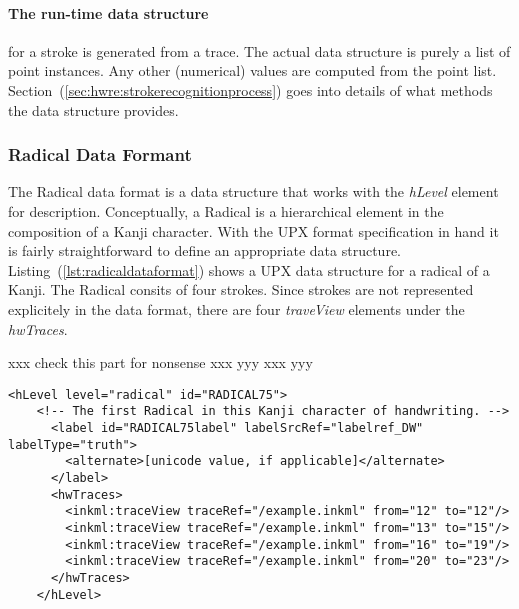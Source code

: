 \paragraph{The run-time data structure} for a stroke is generated from a trace.
The actual data structure is purely a list of point instances. 
Any other (numerical) values are computed from the point list. 
Section~(\ref{sec:hwre:strokerecognitionprocess}) goes into details of what 
methods the data structure provides.

\subsubsection{Radical Data Formant}
\label{sec:hwre:radicaldataformat}

The Radical data format is a data structure that works with the \emph{hLevel}
element for description.
Conceptually, a Radical is a hierarchical element in the composition of a Kanji
character. With the UPX format specification in hand it is fairly 
straightforward to define an appropriate data structure.
Listing~(\ref{lst:radicaldataformat}) shows a UPX data structure for a radical
of a Kanji. The Radical  consits of four strokes.
Since strokes are not represented explicitely in the data format,
there are four \emph{traveView} elements under the \emph{hwTraces}.

xxx check this part for nonsense xxx yyy xxx yyy
\begin{xmlcode}
  \begin{lstlisting}[emph={hLevel,hwTraces,label,alternative},
                     emphstyle=\color{blue}\textbf,
                     emph={[2]level,labelSrcRef,labelType,traceRef,from,to},
                     emphstyle={[2]\color{red}},
                     caption={A sample of how a stroke could be represented},
                     label=lst:radicaldataformat]
    <hLevel level="radical" id="RADICAL75">
    <!-- The first Radical in this Kanji character of handwriting. -->
      <label id="RADICAL75label" labelSrcRef="labelref_DW" labelType="truth">
        <alternate>[unicode value, if applicable]</alternate>
      </label>
      <hwTraces>
        <inkml:traceView traceRef="/example.inkml" from="12" to="12"/>
        <inkml:traceView traceRef="/example.inkml" from="13" to="15"/>
        <inkml:traceView traceRef="/example.inkml" from="16" to="19"/>
        <inkml:traceView traceRef="/example.inkml" from="20" to="23"/>
      </hwTraces>
    </hLevel>
  \end{lstlisting}
\end{xmlcode}

